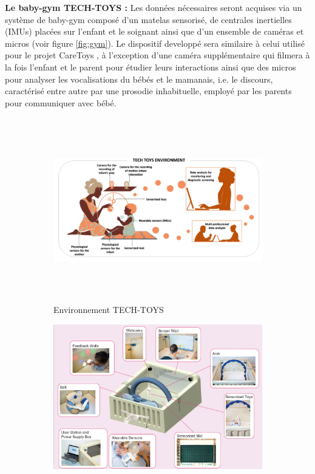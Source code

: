 \documentclass[5pt]{article}
\begin{document}
\textbf{Le baby-gym TECH-TOYS :} Les données nécessaires seront acquises via un système de baby-gym
composé d’un matelas sensorisé, de centrales inertielles (IMUs) placées sur l’enfant et le soignant ainsi que d’un ensemble de caméras et micros (voir figure \ref{fig:gym}). Le dispositif developpé sera similaire à celui utilisé pour le projet CareToys , à l’exception d’une caméra supplémentaire qui filmera à la fois l’enfant et le parent pour étudier leurs interactions ainsi que des micros pour analyser les vocalisations du bébés et le mamanais, i.e. le discours, caractérisé entre autre par une prosodie inhabituelle, employé par les parents pour communiquer avec bébé.
\begin{figure}[H]
    \begin{subfigure}{1\textwidth}
        \centering
        \includegraphics[width=\linewidth, height=8cm]{../TT env.jpg}
        \caption{Environnement TECH-TOYS}
        \label{subfig:gyma}
    \end{subfigure}
    \begin{subfigure}{1\textwidth}
    \centering
        \includegraphics{../babygym.jpg}

\end{subfigure}
\end{figure}
\end{document}
